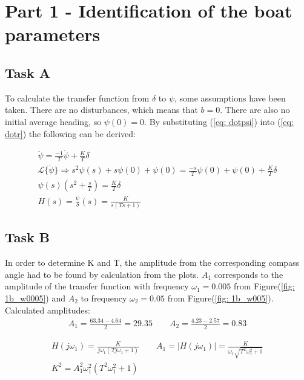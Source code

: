 \section{Part 1 - Identification of the boat parameters}

\subsection{Task A}

To calculate the transfer function from $\delta$ to $\psi$, some assumptions have been taken. There are no disturbances, which means that $b = 0$. There are also no initial average heading, so $\psi(0) = 0$. \newline
By substituting (\ref{eq: dotpsi}) into (\ref{eq: dotr}) the following can be derived:


\begin{align}
    \ddot{\psi} = \frac{-1}{T}\dot{\psi}+\frac{K}{T}\delta  \nonumber    \\
    \mathcal{L}\{\ddot{\psi}\} \Rightarrow s^2\psi(s)+s\psi(0)+\psi(0) = \frac{-s}{T}\psi(0)+\psi(0)+\frac{K}{T}\delta   \nonumber   \\
    \psi(s)(s^2+\frac{s}{T}) = \frac{K}{T}\delta    \nonumber   \\
    H(s) = \frac{\psi}{\delta}(s) = \frac{K}{s(Ts+1)}
\end{align}


\subsection{Task B}
In order to determine K and T, the amplitude from the corresponding compass angle had to be found by calculation from the plots.
$A_1$ corresponds to the amplitude of the transfer function with frequency $\omega_1 = 0.005$ from Figure(\ref{fig: 1b_w0005}) and $A_2$ to frequency $\omega_2 = 0.05$ from Figure(\ref{fig: 1b_w005}).
\\
Calculated amplitudes:
\begin{equation}
    \begin{align}
        A_1 = \frac{63.34 - 4.64}{2} = 29.35 \quad \quad
        A_2 = \frac{4.23 - 2.57}{2} = 0.83 \nonumber
    \end{align}
\end{equation}

\begin{equations}
    \begin{align}
        H(j\omega_1) = \frac{K}{j\omega_1(Tj\omega_1 + 1)} \qquad A_1 = |H(j\omega_1)| = \frac{K}{\omega_1\sqrt{T^2\omega_1^2 + 1}} \nonumber \\
        K^2 = A_1^2\omega_1^2(T^2\omega_1^2 + 1) \label{eq: K_2_1}
    \end{align}
\end{equations}

